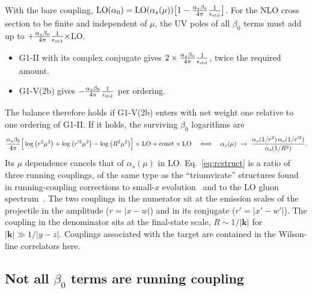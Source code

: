 With the bare coupling, ${\rm LO}(\alpha_0)={\rm LO}(\alpha_s(\mu))\big[1-\frac{\alpha_s\beta_0}{4\pi}\frac{1}{\epsilon_{\rm std}}\big]$. For the NLO cross section to be finite and independent of $\mu$, the UV poles of all $\beta_0$ terms must add up to $+\frac{\alpha_s\beta_0}{4\pi}\frac{1}{\epsilon_{\rm std}}\times$LO.
\begin{itemize}
\item G1-II with its complex conjugate gives $2\times\frac{\alpha_s\beta_0}{4\pi}\frac{1}{\epsilon_{\rm std}}$, twice the required amount.
\item G1-V(2b) gives $-\frac{\alpha_s\beta_0}{4\pi}\frac{1}{\epsilon_{\rm std}}$ per ordering.
\end{itemize}
The balance therefore holds if G1-V(2b) enters with net weight one relative to one ordering of G1-II.
If it holds, the surviving $\beta_0$ logarithms are
\begin{equation}
\frac{\alpha_s\beta_0}{4\pi}\Big[\log\big(r^2\mu^2\big)+\log\big(r'^2\mu^2\big)-\log\big(R^2\mu^2\big)\Big]\times{\rm LO}+\text{const}\times{\rm LO}\quad\Longleftrightarrow\quad\alpha_s(\mu)\ \to\ \frac{\alpha_s(1/r^2)\,\alpha_s(1/r'^2)}{\alpha_s(1/R^2)}.
\label{eq:rcstruct}
\end{equation}
Its $\mu$ dependence cancels that of $\alpha_s(\mu)$ in LO. Eq.~\eqref{eq:rcstruct} is a ratio of three running couplings, of the same type as the ``triumvirate'' structures found in running-coupling corrections to small-$x$ evolution~\cite{Balitsky:2006wa,Kovchegov:2006vj} and to the LO gluon spectrum~\cite{Horowitz:2010yg}. The two couplings in the numerator sit at the emission scales of the projectile in the amplitude ($r=|x-w|$) and in its conjugate ($r'=|x'-w'|$). The coupling in the denominator sits at the final-state scale, $R\sim1/|\mathbf k|$ for $|\mathbf k|\gg1/|y-z|$. Couplings associated with the target are contained in the Wilson-line correlators here.

\subsection{Not all \texorpdfstring{$\beta_0$}{beta0} terms are running coupling}\label{sec:KLSZ}

